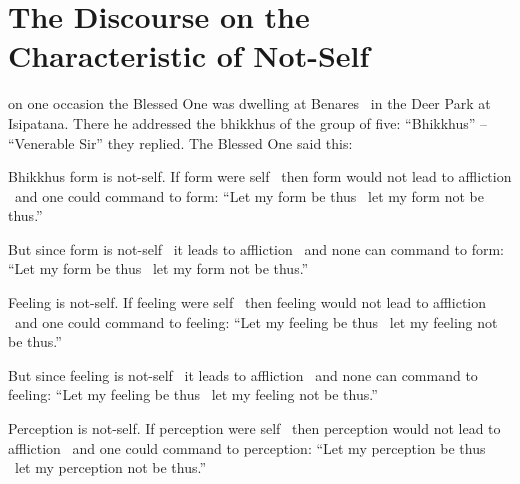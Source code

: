 \section{The Discourse on the Characteristic of Not-Self }
\label{characteristic-of-not-self}

\begin{english-only-hang}
 on one occasion the Blessed One was dwelling at Benares \breathmark\ in the Deer Park at Isipatana. There he addressed the bhikkhus of the group of five: ``Bhikkhus'' – ``Venerable Sir'' they replied. The Blessed One said this:
\end{english-only-hang}

\begin{english-only-hang}
Bhikkhus form is not-self. If form were self \breathmark\ then form would not lead to affliction \breathmark\ and one could command to form: ``Let my form be thus \breathmark\ let my form not be thus.''
\end{english-only-hang}

\begin{english-only-hang}
But since form is not-self \breathmark\ it leads to affliction \breathmark\ and none can command to form: ``Let my form be thus \breathmark\ let my form not be thus.''
\end{english-only-hang}

\begin{english-only-hang}
Feeling is not-self. If feeling were self \breathmark\ then feeling would not lead to affliction \breathmark\ and one could command to feeling: ``Let my feeling be thus \breathmark\ let my feeling not be thus.''
\end{english-only-hang}

\begin{english-only-hang}
But since feeling is not-self \breathmark\ it leads to affliction \breathmark\ and none can command to feeling: ``Let my feeling be thus \breathmark\ let my feeling not be thus.''
\end{english-only-hang}

\begin{english-only-hang}
Perception is not-self. If perception were self \breathmark\ then perception would not lead to affliction \breathmark\ and one could command to perception: ``Let my perception be thus \breathmark\ let my perception not be thus.''
\end{english-only-hang}

